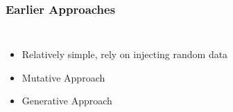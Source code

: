 \begin{frame}
\frametitle{Earlier Approaches}
\begin{columns}
\begin{itemize}
\item{Relatively simple, rely on injecting random data}
\item{Mutative Approach}
\item{Generative Approach}
\end{itemize}
\begin{figure}
\end{figure}
\end{columns}
\end{frame}
